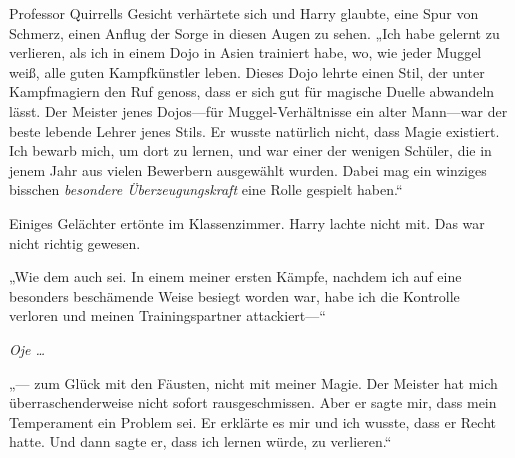 Professor Quirrells Gesicht verhärtete sich und Harry glaubte, eine Spur von Schmerz, einen Anflug der Sorge in diesen Augen zu sehen. „Ich habe gelernt zu verlieren, als ich in einem Dojo in Asien trainiert habe, wo, wie jeder Muggel weiß, alle guten Kampfkünstler leben. Dieses Dojo lehrte einen Stil, der unter Kampfmagiern den Ruf genoss, dass er sich gut für magische Duelle abwandeln lässt. Der Meister jenes Dojos—für Muggel-Verhältnisse ein alter Mann—war der beste lebende Lehrer jenes Stils. Er wusste natürlich nicht, dass Magie existiert. Ich bewarb mich, um dort zu lernen, und war einer der wenigen Schüler, die in jenem Jahr aus vielen Bewerbern ausgewählt wurden. Dabei mag ein winziges bisschen \emph{besondere Überzeugungskraft} eine Rolle gespielt haben.“

Einiges Gelächter ertönte im Klassenzimmer. Harry lachte nicht mit. Das war nicht richtig gewesen.

„Wie dem auch sei. In einem meiner ersten Kämpfe, nachdem ich auf eine besonders beschämende Weise besiegt worden war, habe ich die Kontrolle verloren und meinen Trainingspartner attackiert—“

\emph{Oje …}

„— zum Glück mit den Fäusten, nicht mit meiner Magie. Der Meister hat mich überraschenderweise nicht sofort rausgeschmissen. Aber er sagte mir, dass mein Temperament ein Problem sei. Er erklärte es mir und ich wusste, dass er Recht hatte. Und dann sagte er, dass ich lernen würde, zu verlieren.“

